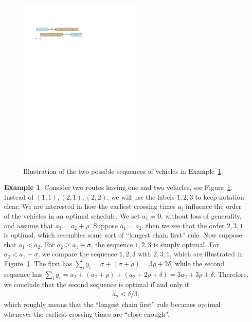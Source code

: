 \documentclass[a4paper]{report}
\theoremstyle{definition}
\newtheorem{eg}{Example}[chapter]
\theoremstyle{plain}
\begin{document}
\begin{figure}[t]
  \centering
  \includegraphics[width=0.55\textwidth]{figures/single/123.pdf}
  \caption{Illustration of the two possible sequences of vehicles in
    Example~\ref{example2}.}\label{fig:example2}
\end{figure}

\begin{eg}\label{example2}
  Consider two routes having one and two vehicles, see
  Figure~\ref{fig:example2}. Instead of $(1,1), (2,1), (2,2)$, we will use the
  labels $1, 2, 3$ to keep notation clear. We are interested in how the earliest
  crossing times $a_i$ influence the order of the vehicles in an optimal
  schedule. We set $a_{1} = 0$, without loss of generality, and assume that
  $a_{3} = a_{2} + \rho$. Suppose $a_{1} = a_{2}$, then we see that the order
  $2, 3, 1$ is optimal, which resembles some sort of ``longest chain first'' rule.
  Now suppose that $a_{1} < a_{2}$. For $a_{2} \geq a_{1} + \sigma$, the sequence
  $1, 2, 3$ is simply optimal. For $a_{2} < a_{1} + \sigma$, we compare the
  sequence $1, 2, 3$ with $2, 3, 1$, which are illustrated in Figure~\ref{fig:example2}. The
  first has $\sum_{i} y_{i} = \sigma + (\sigma+\rho) = 3\rho + 2\delta$, while the second sequence
  has
  $\sum_{i} y_{i} = a_{2} + (a_{2} + \rho) + (a_{2} + 2\rho + \delta) = 3 a_{2} + 3\rho + \delta$.
  Therefore, we conclude that the second sequence is optimal if and only if
  \begin{align}
    \label{eq:before-condition}
    a_{2} \leq \delta/3 ,
  \end{align}
  which roughly means that the ``longest chain first'' rule becomes optimal
  whenever the earliest crossing times are ``close enough''.
\end{eg}
\end{document}
